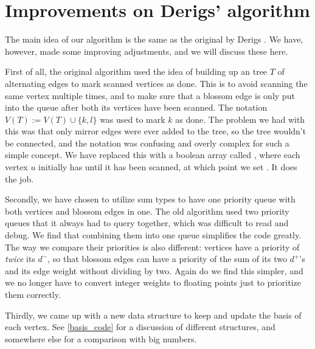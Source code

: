 \section{Improvements on Derigs' algorithm}
The main idea of our algorithm is the same as the original by Derigs \cite{derigs_shortest_odd_path}. We have, however, made some improving adjustments, and we will discuss these here.

First of all, the original algorithm used the idea of building up an tree $T$ of alternating edges to mark scanned vertices as done. This is to avoid scanning the same vertex multiple times, and to make sure that a blossom edge is only put into the queue after both its vertices have been scanned. The notation $V(T) := V(T) \cup \{k,l\}$ was used to mark $k$ as done. The problem we had with this was that only mirror edges were ever added to the tree, so the tree wouldn't be connected, and the notation was confusing and overly complex for such a simple concept. We have replaced this with a boolean array called , where each vertex $u$ initially has  until it has been scanned, at which point we set . It does the job.

Secondly, we have chosen to utilize sum types to have one priority queue with both vertices and blossom edges in one. The old algorithm used two priority queues that it always had to query together, which was difficult to read and debug. We find that combining them into one queue simplifies the code greatly. The way we compare their priorities is also different: vertices have a priority of \emph{twice} its $d^-$, so that blossom edges can have a priority of the sum of its two $d^+$'s and its edge weight without dividing by two. Again do we find this simpler, and we no longer have to convert integer weights to floating points just to prioritize them correctly.

Thirdly, we came up with a new data structure to keep and update the basis of each vertex. See \ref{basis_code} for a discussion of different structures, and somewhere else for a comparison with big numbers. 
